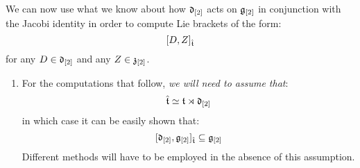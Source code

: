         \begin{remark} \label{remark: derivation_action_on_toroidal_centres}
            We can now use what we know about how $\mathfrak{d}_{[2]}$ acts on $\mathfrak{g}_{[2]}$ in conjunction with the Jacobi identity in order to compute Lie brackets of the form:
                $$[D, Z]_{\hat{\mathfrak{t}}}$$
            for any $D \in \mathfrak{d}_{[2]}$ and any $Z \in \mathfrak{z}_{[2]}$. 
        
            \begin{enumerate}
                \item For the computations that follow, \textit{we will need to assume that}:
                    $$\hat{\mathfrak{t}} \simeq \mathfrak{t}\rtimes \mathfrak{d}_{[2]}$$
                in which case it can be easily shown that:
                    $$[\mathfrak{d}_{[2]}, \mathfrak{g}_{[2]}]_{\hat{\mathfrak{t}}} \subseteq \mathfrak{g}_{[2]}$$
                Different methods will have to be employed in the absence of this assumption.
    

\end{enumerate}
\end{remark}
